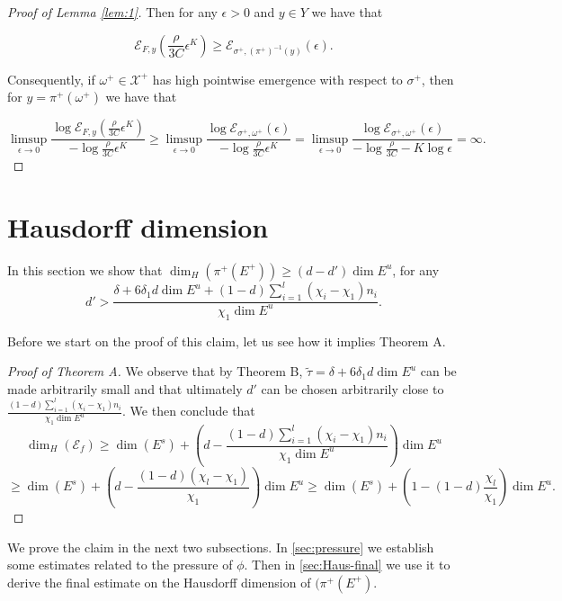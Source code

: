 \documentclass{amsart}
\theoremstyle{plain}
\theoremstyle{definition}
\theoremstyle{remark}
\numberwithin{equation}{section}
\newcommand{\foot}[1]{\marginpar{\tiny\raggedright #1}}
\newcommand{\az}[1]{\foot{AZ: #1}}
\begin{document}
\begin{proof}[Proof of Lemma \ref{lem:1}]
Then for any $\epsilon>0$ and $y\in Y$ we have that

$$   \mathcal{E}_{F,y}\left(   \frac{\rho}{3C} \epsilon^K   \right)\geq  \mathcal{E}_{\sigma^+,(\pi^+)^{-1}(y)}(\epsilon).  $$

Consequently, if $\omega^+\in \mathcal{X}^+$ has high pointwise emergence with respect to $\sigma^+$, then for $y=\pi^+(\omega^+)$ we have that

$$   \limsup_{\epsilon \to 0}   \frac{\log     \mathcal{E}_{F,y}(   \frac{\rho}{3C} \epsilon^K   )    }{  - \log   \frac{\rho}{3C} \epsilon^K     }   \geq  \limsup_{\epsilon \to 0}   \frac{  \log  \mathcal{E}_{\sigma^+,\omega^+}(\epsilon)    }{   - \log   \frac{\rho}{3C} \epsilon^K   }  
=   \limsup_{\epsilon \to 0}   \frac{ \log   \mathcal{E}_{\sigma^+,\omega^+}(\epsilon)    }{   - \log   \frac{\rho}{3C} - K \log  \epsilon   }   = \infty.   $$

\end{proof}


\section{Hausdorff dimension}\label{sec:dim}

In this section we show that $  \dim_H  (\pi^+(E^+))   \geq   (d- d')\dim E^u$,  
for any  $$d' >   \frac{\delta + 6 \delta_1 d \dim E^u + (1-d)\sum_{i=1}^l(\chi_i -\chi_1) n_i}{\chi_1 \dim E^u}.  $$

Before we start on the proof of this claim, let us see how it implies Theorem A.

\begin{proof}[Proof of Theorem A]
We observe that by Theorem B, $\tilde{\tau}= \delta + 6 \delta_1 d \dim E^u$ can be made arbitrarily small %
and that ultimately $d'$ can be chosen arbitrarily close to $  \frac{ (1-d)\sum_{i=1}^l(\chi_i -\chi_1) n_i}{\chi_1 \dim E^u}.$
We then conclude that
$$  \dim_H(\mathcal{E}_f) \geq \dim(E^s) + \left(d-   \frac{ (1-d)\sum_{i=1}^l(\chi_i -\chi_1) n_i}{\chi_1 \dim E^u}\right)  \dim E^u    $$
$$ \geq     \dim(E^s) + \left(d-   \frac{ (1-d)(\chi_l -\chi_1) }{\chi_1 }\right) \dim E^u   \geq  \dim(E^s) +  \left( 1   - (1-d)\frac{\chi_l}{\chi_1}   \right)\dim E^u .   $$



\end{proof}


We prove the claim in the next two subsections. In \ref{sec:pressure} we establish some estimates related to the pressure of $\phi$. Then in \ref{sec:Haus-final} we use it to derive the final estimate on the Hausdorff dimension of $(\pi^+(E^+)$.
\end{document}
